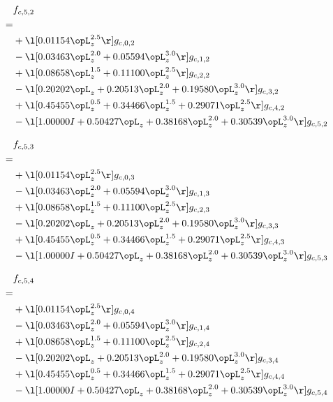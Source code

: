 \begin{alignat}{2} 
\label{eq:f_52_0} 
& f_{c,5,2} \nonumber \\ 
 = \\ 
& + \l[  0.01154 \opL_z^{2.5}  \r] g_{c,0,2} \nonumber \\ 
& - \l[  0.03463 \opL_z^{2.0} +  0.05594 \opL_z^{3.0}  \r] g_{c,1,2} \nonumber \\ 
& + \l[  0.08658 \opL_z^{1.5} +  0.11100 \opL_z^{2.5}  \r] g_{c,2,2} \nonumber \\ 
& - \l[  0.20202 \opL_z +  0.20513 \opL_z^{2.0} +  0.19580 \opL_z^{3.0}  \r] g_{c,3,2} \nonumber \\ 
& + \l[  0.45455 \opL_z^{0.5} +  0.34466 \opL_z^{1.5} +  0.29071 \opL_z^{2.5}  \r] g_{c,4,2} \nonumber \\ 
& - \l[  1.00000 I +  0.50427 \opL_z +  0.38168 \opL_z^{2.0} +  0.30539 \opL_z^{3.0}  \r] g_{c,5,2} \nonumber \\ 
\end{alignat} 


\begin{alignat}{2} 
\label{eq:f_53_0} 
& f_{c,5,3} \nonumber \\ 
 = \\ 
& + \l[  0.01154 \opL_z^{2.5}  \r] g_{c,0,3} \nonumber \\ 
& - \l[  0.03463 \opL_z^{2.0} +  0.05594 \opL_z^{3.0}  \r] g_{c,1,3} \nonumber \\ 
& + \l[  0.08658 \opL_z^{1.5} +  0.11100 \opL_z^{2.5}  \r] g_{c,2,3} \nonumber \\ 
& - \l[  0.20202 \opL_z +  0.20513 \opL_z^{2.0} +  0.19580 \opL_z^{3.0}  \r] g_{c,3,3} \nonumber \\ 
& + \l[  0.45455 \opL_z^{0.5} +  0.34466 \opL_z^{1.5} +  0.29071 \opL_z^{2.5}  \r] g_{c,4,3} \nonumber \\ 
& - \l[  1.00000 I +  0.50427 \opL_z +  0.38168 \opL_z^{2.0} +  0.30539 \opL_z^{3.0}  \r] g_{c,5,3} \nonumber \\ 
\end{alignat} 


\begin{alignat}{2} 
\label{eq:f_54_0} 
& f_{c,5,4} \nonumber \\ 
 = \\ 
& + \l[  0.01154 \opL_z^{2.5}  \r] g_{c,0,4} \nonumber \\ 
& - \l[  0.03463 \opL_z^{2.0} +  0.05594 \opL_z^{3.0}  \r] g_{c,1,4} \nonumber \\ 
& + \l[  0.08658 \opL_z^{1.5} +  0.11100 \opL_z^{2.5}  \r] g_{c,2,4} \nonumber \\ 
& - \l[  0.20202 \opL_z +  0.20513 \opL_z^{2.0} +  0.19580 \opL_z^{3.0}  \r] g_{c,3,4} \nonumber \\ 
& + \l[  0.45455 \opL_z^{0.5} +  0.34466 \opL_z^{1.5} +  0.29071 \opL_z^{2.5}  \r] g_{c,4,4} \nonumber \\ 
& - \l[  1.00000 I +  0.50427 \opL_z +  0.38168 \opL_z^{2.0} +  0.30539 \opL_z^{3.0}  \r] g_{c,5,4} \nonumber \\ 
\end{alignat} 


